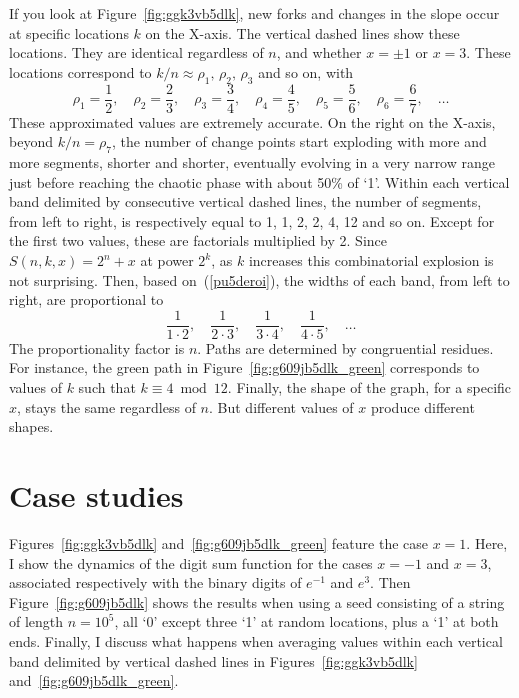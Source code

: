 \documentclass[10pt]{article}
\begin{document}
If you look at Figure~\ref{fig:ggk3vb5dlk}, new forks and changes in the slope occur at specific locations $k$ on the X-axis. The vertical dashed lines show these locations. They are identical regardless of $n$, and whether $x=\pm 1$ or $x=3$. These locations correspond to $k/n\approx \rho_1, \, \rho_2, \, \rho_3$ and so on, with
\begin{equation}
\rho_1 = \frac{1}{2},  \quad \rho_2 = \frac{2}{3}, \quad \rho_3 = \frac{3}{4}, 
\quad \rho_4 = \frac{4}{5}, \quad \rho_5 = \frac{5}{6}, \quad
\rho_6 = \frac{6}{7}, \quad \dots \label{pu5deroi}
\end{equation}
These approximated values are extremely accurate. On the right on the X-axis, beyond $k/n =\rho_7$, the number of change points start exploding with more and more segments, shorter and shorter, eventually evolving in a very narrow range just before reaching the chaotic phase with about 50\% of `1'. Within each vertical band delimited by consecutive vertical dashed lines, the number of segments, from left to right,
 is respectively equal to 1, 1, 2, 2, 4, 12 and so on.  
Except for the first two values, these are factorials multiplied by 2. Since $S(n, k, x) = 2^n + x$ at power $2^k$, as $k$ increases this combinatorial explosion is not surprising.
Then, 
based on~(\ref{pu5deroi}), the widths of each band, from left to right,
 are proportional to 
$$\frac{1}{1\cdot 2}, \quad \frac{1}{2\cdot 3}, \quad \frac{1}{3\cdot 4},\quad
\frac{1}{4\cdot 5}, \quad \dots
$$ 
 The proportionality factor is $n$.  Paths are determined by congruential residues. For instance, the green path in Figure~\ref{fig:g609jb5dlk_green}
 corresponds to values of $k$ such that $k \equiv 4 \bmod{12}$.
Finally, the shape of the graph, for a specific $x$, stays the same regardless of $n$. But different values of $x$ produce different shapes. 
\vspace{1ex}

\section{Case studies}

Figures~\ref{fig:ggk3vb5dlk} and~\ref{fig:g609jb5dlk_green} feature the case $x=1$. Here, I show the dynamics of the digit sum function for the cases
 $x=-1$ and $x=3$, associated respectively with the binary digits of $e^{-1}$ and $e^3$. Then 
Figure~\ref{fig:g609jb5dlk} shows the results when using a seed consisting of a string of length $n=10^5$, all `0' except  three `1' at random locations, plus a 
 `1' at both ends. Finally, I discuss what happens when averaging values within each vertical band delimited by vertical dashed lines 
in Figures~\ref{fig:ggk3vb5dlk} and~\ref{fig:g609jb5dlk_green}.
\vspace{1ex}
\end{document}
